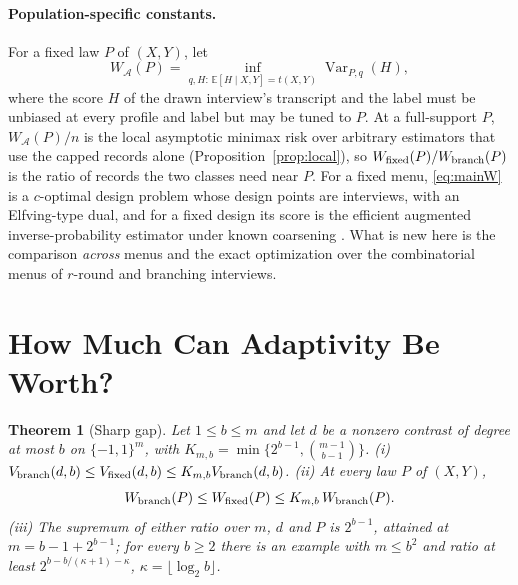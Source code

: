 \documentclass{article}
\newtheorem{theorem}{Theorem}
\newcommand{\E}{\mathbb{E}}
\newcommand{\Var}{\operatorname{Var}}
\newcommand{\A}{\mathcal A}
\begin{document}
\paragraph{Population-specific constants.}
For a fixed law $P$ of $(X,Y)$, let
\begin{equation}
 W_{\A}(P)=\inf_{q,H:\,\E[H\mid X,Y]=t(X,Y)}\Var_{P,q}(H),\label{eq:mainW}
\end{equation}
where the score $H$ of the drawn interview's transcript and the label must be unbiased at every profile and label but may be tuned to $P$. At a full-support $P$, $W_\A(P)/n$ is the local asymptotic minimax risk over arbitrary estimators that use the capped records alone (Proposition~\ref{prop:local}), so $W_{\rm fixed}(P)/W_{\rm branch}(P)$ is the ratio of records the two classes need near $P$. For a fixed menu, \eqref{eq:mainW} is a $c$-optimal design problem whose design points are interviews, with an Elfving-type dual, and for a fixed design its score is the efficient augmented inverse-probability estimator under known coarsening \citep{elfving1952,pukelsheim1993,robins1994,tsiatis2006}. What is new here is the comparison \emph{across} menus and the exact optimization over the combinatorial menus of $r$-round and branching interviews.

\section{How Much Can Adaptivity Be Worth?}\label{sec:gap}
\begin{theorem}[Sharp gap]\label{thm:universal}
Let $1\le b\le m$ and let $d$ be a nonzero contrast of degree at most $b$ on $\{-1,1\}^m$, with $K_{m,b}=\min\{2^{b-1},\binom{m-1}{b-1}\}$.
\textup{(i)} $V_{\rm branch}(d,b)\le V_{\rm fixed}(d,b)\le K_{m,b}V_{\rm branch}(d,b)$.
\textup{(ii)} At every law $P$ of $(X,Y)$,
\begin{equation}
 W_{\rm branch}(P)\le W_{\rm fixed}(P)\le K_{m,b}\,W_{\rm branch}(P).\label{eq:universal}
\end{equation}
\textup{(iii)} The supremum of either ratio over $m$, $d$ and $P$ is $2^{b-1}$, attained at $m=b-1+2^{b-1}$; for every $b\ge2$ there is an example with $m\le b^2$ and ratio at least $2^{b-b/(\kappa+1)-\kappa}$, $\kappa=\lfloor\log_2 b\rfloor$.
\end{theorem}
\end{document}
